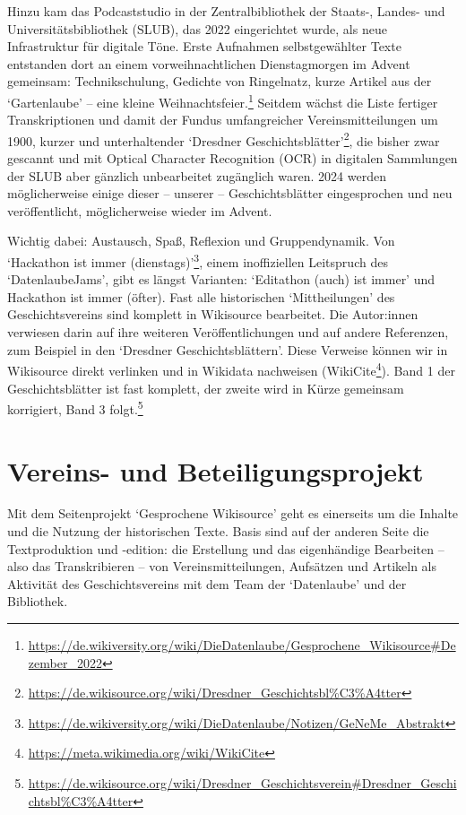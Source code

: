 \documentclass[a4paper,
fontsize=11pt,
oneside,
numbers=noperiodatend,
parskip=half-,
bibliography=totoc,
final
]{scrartcl}
\begin{document}
Hinzu kam das Podcaststudio in der Zentralbibliothek der Staats-,
Landes- und Universitätsbibliothek (SLUB), das 2022 eingerichtet wurde,
als neue Infrastruktur für digitale Töne. Erste Aufnahmen
selbstgewählter Texte entstanden dort an einem vorweihnachtlichen
Dienstagmorgen im Advent gemeinsam: Technikschulung, Gedichte von
Ringelnatz, kurze Artikel aus der \enquote*{Gartenlaube} -- eine kleine
Weihnachtsfeier.\footnote{\url{https://de.wikiversity.org/wiki/DieDatenlaube/Gesprochene_Wikisource\#Dezember_2022}}
Seitdem wächst die Liste fertiger Transkriptionen und damit der Fundus
umfangreicher Vereinsmitteilungen um 1900, kurzer und unterhaltender
\enquote*{Dresdner Geschichtsblätter}\footnote{\url{https://de.wikisource.org/wiki/Dresdner_Geschichtsbl\%C3\%A4tter}},
die bisher zwar gescannt und mit Optical Character Recognition (OCR) in
digitalen Sammlungen der SLUB aber gänzlich unbearbeitet zugänglich
waren. 2024 werden möglicherweise einige dieser -- unserer --
Geschichtsblätter eingesprochen und neu veröffentlicht, möglicherweise
wieder im Advent.

Wichtig dabei: Austausch, Spaß, Reflexion und Gruppendynamik. Von
\enquote*{Hackathon ist immer (dienstags)}\footnote{\url{https://de.wikiversity.org/wiki/DieDatenlaube/Notizen/GeNeMe_Abstrakt}},
einem inoffiziellen Leitspruch des \enquote*{DatenlaubeJams}, gibt es
längst Varianten: \enquote*{Editathon (auch) ist immer} und Hackathon
ist immer (öfter). Fast alle historischen \enquote*{Mittheilungen} des
Geschichtsvereins sind komplett in Wikisource bearbeitet. Die
Autor:innen verwiesen darin auf ihre weiteren Veröffentlichungen und auf
andere Referenzen, zum Beispiel in den \enquote*{Dresdner
Geschichtsblättern}. Diese Verweise können wir in Wikisource direkt
verlinken und in Wikidata nachweisen (WikiCite\footnote{\url{https://meta.wikimedia.org/wiki/WikiCite}}).
Band 1 der Geschichtsblätter ist fast komplett, der zweite wird in Kürze
gemeinsam korrigiert, Band 3 folgt.\footnote{\url{https://de.wikisource.org/wiki/Dresdner_Geschichtsverein\#Dresdner_Geschichtsbl\%C3\%A4tter}}

\hypertarget{vereins--und-beteiligungsprojekt}{%
\section{Vereins- und
Beteiligungsprojekt}\label{vereins--und-beteiligungsprojekt}}

Mit dem Seitenprojekt \enquote*{Gesprochene Wikisource} geht es
einerseits um die Inhalte und die Nutzung der historischen Texte. Basis
sind auf der anderen Seite die Textproduktion und -edition: die
Erstellung und das eigenhändige Bearbeiten -- also das Transkribieren --
von Vereinsmitteilungen, Aufsätzen und Artikeln als Aktivität des
Geschichtsvereins mit dem Team der \enquote*{Datenlaube} und der
Bibliothek.
\end{document}
